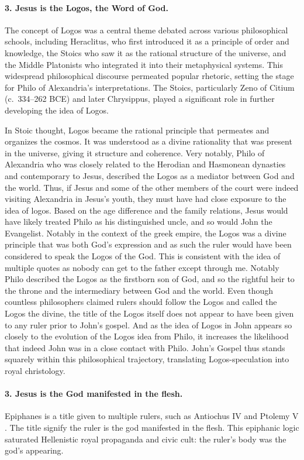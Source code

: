 \paragraph{3.
Jesus is the Logos, the Word of God.}\label{par:jesus-is-the-logos-the-word-of-god.}
The concept of Logos was a central theme debated across various philosophical schools, including Heraclitus, who first introduced it as a principle of order and knowledge, the Stoics who saw it as the rational structure of the universe, and the Middle Platonists who integrated it into their metaphysical systems.
This widespread philosophical discourse permeated popular rhetoric, setting the stage for Philo of Alexandria’s interpretations.
The Stoics, particularly Zeno of Citium (c.~334–262 BCE) and later Chrysippus, played a significant role in further developing the idea of Logos.

In Stoic thought, Logos became the rational principle that permeates and organizes the cosmos.
It was understood as a divine rationality that was present in the universe, giving it structure and coherence.
Very notably, Philo of Alexandria who was closely related to the Herodian and Hasmonean dynasties and contemporary to Jesus, described the Logos as a mediator between God and the world.
Thus, if Jesus and some of the other members of the court were indeed visiting Alexandria in Jesus’s youth, they must have had close exposure to the idea of logos.
Based on the age difference and the family relations, Jesus would have likely treated Philo as his distinguished uncle, and so would John the Evangelist.
Notably in the context of the greek empire, the Logos was a divine principle that was both God’s expression and as such the ruler would have been considered to speak the Logos of the God.
This is consistent with the idea of multiple quotes as nobody can get to the father except through me.
Notably Philo described the Logos as the firstborn son of God, and so the rightful heir to the throne and the intermediary between God and the world.
Even though countless philosophers claimed rulers should follow the Logos and called the Logos the divine, the title of the Logos itself does not appear to have been given to any ruler prior to John’s gospel.
And as the idea of Logos in John appears so closely to the evolution of the Logos idea from Philo, it increases the likelihood that indeed John was in a close contact with Philo.
John’s Gospel thus stands squarely within this philosophical trajectory, translating Logos-speculation into royal christology.

\paragraph{3.
Jesus is the God manifested in the flesh.}\label{par:jesus-is-the-god-manifested-in-the-flesh.}
Epiphanes is a title given to multiple rulers, such as Antiochus IV and Ptolemy V .
The title signify the ruler is the god manifested in the flesh.
This epiphanic logic saturated Hellenistic royal propaganda and civic cult: the ruler’s body was the god’s appearing.


